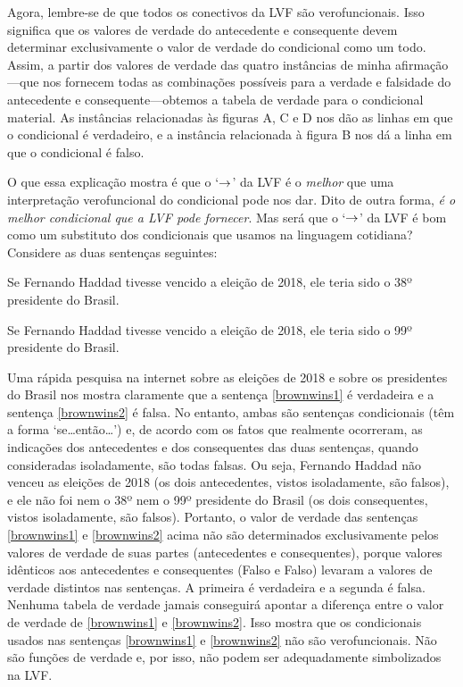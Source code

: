 Agora, lembre-se de que todos os conectivos da LVF são verofuncionais. Isso significa que os valores de verdade do antecedente e consequente devem determinar exclusivamente o valor de verdade do condicional como um todo.
Assim, a partir dos valores de verdade das quatro instâncias de minha afirmação---que nos fornecem todas as combinações possíveis para a verdade e falsidade do antecedente e consequente---obtemos a tabela de verdade para o condicional material.
As instâncias relacionadas às figuras A, C e D nos dão as linhas em que o condicional é verdadeiro, e a instância relacionada à figura B nos dá a linha em que o condicional é falso.

O que essa explicação mostra é que o `$\rightarrow$' da LVF é o \emph{melhor} que uma interpretação verofuncional do condicional pode nos dar.
Dito de outra forma, \emph{é o melhor condicional que a LVF pode fornecer}.
Mas será que o `$\rightarrow$' da LVF é bom como um substituto dos condicionais que usamos na linguagem cotidiana?
Considere as duas sentenças seguintes:
	\begin{earg}
		\item[\ex{brownwins1}] Se Fernando Haddad tivesse vencido a eleição de 2018, ele teria sido o 38º  presidente do Brasil.
		\item[\ex{brownwins2}] Se Fernando Haddad tivesse vencido a eleição de 2018, ele teria sido o 99º presidente do Brasil.
	\end{earg}
Uma rápida pesquisa na internet sobre as eleições de 2018 e sobre os presidentes do Brasil nos mostra claramente que a sentença \ref{brownwins1} é verdadeira e a sentença \ref{brownwins2} é falsa.
No entanto, ambas são sentenças condicionais (têm a forma `se\ldots então\ldots') e, de acordo com os fatos que realmente ocorreram, as indicações dos antecedentes e dos consequentes das duas sentenças, quando consideradas isoladamente, são todas falsas.
Ou seja, Fernando Haddad não venceu as eleições de 2018 (os dois antecedentes, vistos isoladamente, são falsos), e ele não foi nem o 38º nem o 99º presidente do Brasil (os dois consequentes, vistos isoladamente, são falsos).
Portanto, o valor de verdade das sentenças \ref{brownwins1} e \ref{brownwins2} acima não são determinados  exclusivamente pelos valores de verdade de suas partes (antecedentes e consequentes),
porque valores idênticos aos antecedentes e consequentes (Falso e Falso) levaram a valores de verdade distintos nas sentenças.
A primeira é verdadeira e a segunda é falsa.
Nenhuma tabela de verdade jamais conseguirá apontar a diferença entre o valor de verdade de \ref{brownwins1} e \ref{brownwins2}.
Isso mostra que os condicionais usados nas sentenças \ref{brownwins1} e \ref{brownwins2} não são verofuncionais.
Não são funções de verdade e, por isso, não podem ser adequadamente simbolizados na LVF.

